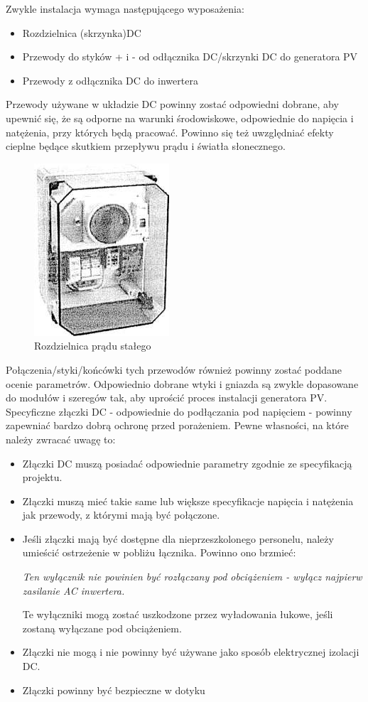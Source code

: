 \documentclass[12pt,a4paper]{article}
\begin{document}
Zwykle instalacja wymaga następującego wyposażenia: 

\begin{itemize}
\item Rozdzielnica (skrzynka)DC 
\item Przewody do styków + i - od odłącznika DC/skrzynki DC do 
generatora PV 
\item Przewody z odłącznika DC do inwertera 
\end{itemize}
Przewody używane w układzie DC powinny zostać odpowiedni dobrane, aby 
upewnić się, że są odporne na warunki środowiskowe, odpowiednie do 
napięcia i natężenia, przy których będą pracować. Powinno się też 
uwzględniać efekty cieplne będące skutkiem przepływu prądu i światła 
słonecznego. 

\begin{figure}[H]
\centering
\caption{Rozdzielnica prądu stałego}
\includegraphics[natwidth=5.03cm,natheight=6.45cm]{media/image14.jpg}
\end{figure}
 
Połączenia/styki/końcówki tych przewodów również powinny zostać poddane 
ocenie parametrów. Odpowiednio dobrane wtyki i gniazda są zwykle 
dopasowane do modułów i szeregów tak, aby uprościć proces instalacji 
generatora PV. Specyficzne złączki DC - odpowiednie do podłączania pod 
napięciem - powinny zapewniać bardzo dobrą ochronę przed porażeniem. 
Pewne własności, na które należy zwracać uwagę to: 

\begin{itemize}
\item Złączki DC muszą posiadać odpowiednie parametry zgodnie ze 
specyfikacją projektu. 
\item Złączki muszą mieć takie same lub większe specyfikacje napięcia i 
natężenia jak przewody, z którymi mają być połączone. 
\item Jeśli złączki mają być dostępne dla nieprzeszkolonego personelu, 
należy umieścić ostrzeżenie w pobliżu łącznika. Powinno ono brzmieć: 
\begin{displayquote}
\textit{Ten wyłącznik nie powinien być rozłączany pod obciążeniem - wyłącz 
najpierw zasilanie AC inwertera.}
\end{displayquote}
 Te wyłączniki mogą zostać uszkodzone 
przez wyładowania łukowe, jeśli zostaną wyłączane pod obciążeniem. 
\item Złączki nie mogą i nie powinny być używane jako sposób 
elektrycznej izolacji DC. 
\item Złączki powinny być bezpieczne w dotyku 
\end{itemize}
 
\end{document}
